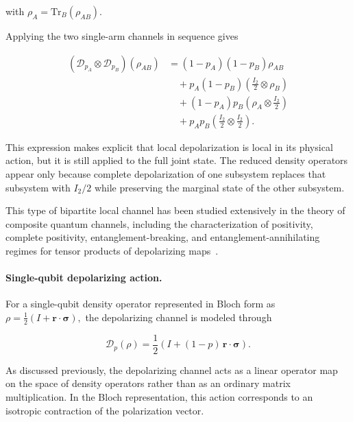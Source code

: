 with
\(
\rho_A
=
\mathrm{Tr}_B(\rho_{AB}).
\)

\medskip 

Applying the two single-arm channels in sequence gives

\begin{align}
\left(
\mathcal{D}_{p_A}
\otimes
\mathcal{D}_{p_B}
\right)
(\rho_{AB})
&=
(1-p_A)(1-p_B)\rho_{AB}
\nonumber
\\
&\quad
+
p_A(1-p_B)
\left(
\frac{I_2}{2}
\otimes
\rho_B
\right)
\nonumber
\\
&\quad
+
(1-p_A)p_B
\left(
\rho_A
\otimes
\frac{I_2}{2}
\right)
\nonumber
\\
&\quad
+
p_Ap_B
\left(
\frac{I_2}{2}
\otimes
\frac{I_2}{2}
\right).
\label{eq:two_arm_depolarization_explicit}
\end{align}

This expression makes explicit that local depolarization is local in its physical action, but it is still applied to the full joint state. The reduced density operators appear only because complete depolarization of one subsystem replaces that subsystem with \( I_2/2 \) while preserving the marginal state of the other subsystem.

\medskip

This type of bipartite local channel has been studied extensively in the theory of composite quantum channels, including the characterization of positivity, complete positivity, entanglement-breaking, and entanglement-annihilating regimes for tensor products of depolarizing maps~\cite{lami_bipartite_depolarizing_maps}.

\medskip

\paragraph{Single-qubit depolarizing action.}

For a single-qubit density operator represented in Bloch form as
\(
\rho
=
\frac{1}{2}
\left(
I
+
\mathbf{r}\cdot\boldsymbol{\sigma}
\right),
\)
the depolarizing channel is modeled through

\begin{equation}
\mathcal{D}_{p}(\rho)
=
\frac{1}{2}
\left(
I
+
(1-p)\,
\mathbf{r}\cdot\boldsymbol{\sigma}
\right).
\label{eq:bloch_contraction_channel}
\end{equation}

\medskip

As discussed previously, the depolarizing channel acts as a linear operator map on the space of density operators rather than as an ordinary matrix multiplication. In the Bloch representation, this action corresponds to an isotropic contraction of the polarization vector.

